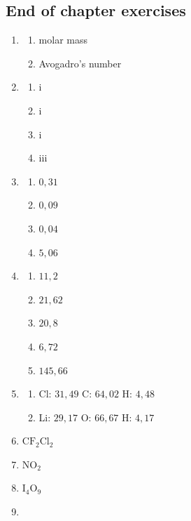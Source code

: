 \subsection{End of chapter exercises}
\begin{multicols}{4}
 \begin{enumerate}[noitemsep, label=\textbf{(\arabic*)} ]
  \item 
\begin{enumerate}[noitemsep, label=\textbf{(\alph*)} ]
 \item molar mass
\item Avogadro's number
\end{enumerate}
  \item 
\begin{enumerate}[noitemsep, label=\textbf{(\alph*)} ]
 \item i
\item i
\item i
\item iii
\end{enumerate}
\item
\begin{enumerate}[noitemsep, label=\textbf{(\alph*)} ]
 \item $0,31$
\item $0,09$
\item $0,04$
\item $5,06$
\end{enumerate}
\item
\begin{enumerate}[noitemsep, label=\textbf{(\alph*)} ]
 \item $11,2$
\item $21,62$
\item $20,8$
\item $6,72$
\item $145,66$
\end{enumerate}
\item
\begin{enumerate}[noitemsep, label=\textbf{(\alph*)} ]
 \item Cl: $31,49$ C: $64,02$ H: $4,48$
\item Li: $29,17$ O: $66,67$ H: $4,17$ 
\end{enumerate}
\item $\text{CF}_{2}\text{Cl}_{2}$
\item $\text{NO}_{2}$
\item $\text{I}_{4}\text{O}_{9}$
\item 
\begin{enumerate}[noitemsep, label=\textbf{(\alph*)} ]

\end{enumerate}
\end{enumerate}
\end{multicols}
